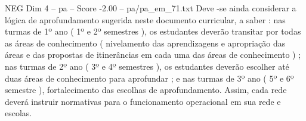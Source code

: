 \begin{textsample}{NEG Dim 4 – pa – Score -2.00 – pa/pa\_em\_71.txt}
Deve -se ainda considerar a lógica de aprofundamento sugerida neste documento curricular, a saber : nas turmas de 1º ano ( 1º e 2º semestres ), os estudantes deverão transitar por todas as áreas de conhecimento ( nivelamento das aprendizagens e apropriação das áreas e das propostas de itinerâncias em cada uma das áreas de conhecimento ) ; nas turmas de 2º ano ( 3º e 4º semestres ), os estudantes deverão escolher até duas áreas de conhecimento para aprofundar ; e nas turmas de 3º ano ( 5º e 6º semestre ), fortalecimento das escolhas de aprofundamento.
Assim, cada rede deverá instruir normativas para o funcionamento operacional em sua rede e escolas.

\end{textsample}
